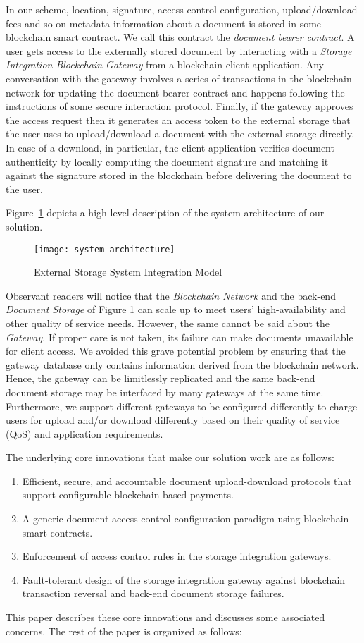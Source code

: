 In our scheme, location, signature, access control configuration, upload/download fees and so on metadata information about a document is stored in some blockchain smart contract. We call this contract the {\it document bearer contract}. A user gets access to the externally stored document by interacting with a \textit{Storage Integration Blockchain Gateway} from a blockchain client application. Any conversation with the gateway involves a series of transactions in the blockchain network for updating the document bearer contract and happens following the instructions of some secure interaction protocol. Finally, if the gateway approves the access request then it generates an access token to the external storage that the user uses to upload/download a document with the external storage directly. In case of a download, in particular, the client application verifies document authenticity by locally computing the document signature and matching it against the signature stored in the blockchain before delivering the document to the user. 

Figure~\ref{fig-1} depicts a high-level description of the system architecture of our solution.   
\begin{figure}[h]
\centering
\texttt{[image: system-architecture]}                    
\caption{External Storage System Integration Model}\label{fig-1}
\end{figure}
Observant readers will notice that the \textit{Blockchain Network} and the back-end \textit{Document Storage} of Figure \ref{fig-1} can scale up to meet users' high-availability and other quality of service needs. However, the same cannot be said about the \textit{Gateway}. If proper care is not taken, its failure can make documents unavailable for client access. We avoided this grave potential problem by ensuring that the gateway database only contains information derived from the blockchain network. Hence, the gateway can be limitlessly replicated and the same back-end document storage may be interfaced by many gateways at the same time. Furthermore, we support different gateways to be configured differently to charge users for upload and/or download differently based on their quality of service (QoS) and application requirements.

The underlying core innovations that make our solution work are as follows:
\begin{enumerate}
\item Efficient, secure, and accountable document upload-download protocols that support configurable blockchain based payments.
\item A generic document access control configuration paradigm using blockchain smart contracts. 
\item Enforcement of access control rules in the storage integration gateways.
\item Fault-tolerant design of the storage integration gateway against blockchain transaction reversal and back-end document storage failures.   
\end{enumerate}         
This paper describes these core innovations and discusses some associated concerns. The rest of the paper is organized as follows:

